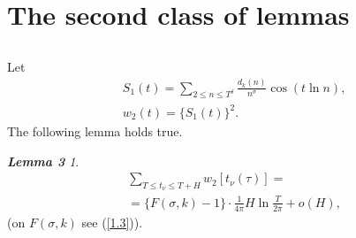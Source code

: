 \documentclass{amsart}
\theoremstyle{definition}
\theoremstyle{remark}
\newtheorem*{mydef53}{{\bf Lemma 3}}
\numberwithin{equation}{section}
\begin{document}
\section{The second class of lemmas}

\subsection{}

Let
\begin{equation} \label{5.1}
\begin{split}
 & S_1(t)=\sum_{2\leq n\leq T^\delta}\frac{d_k(n)}{n^\sigma}\cos(t\ln n), \\
 & w_2(t)=\{ S_1(t)\}^2.
\end{split}
\end{equation}
The following lemma holds true.

\begin{mydef53}
\begin{equation} \label{5.2}
\begin{split}
 & \sum_{T\leq t_\nu\leq T+H} w_2[t_\nu(\tau)]= \\
 & = \{ F(\sigma,k)-1\}\cdot \frac{1}{4\pi} H\ln\frac{T}{2\pi}+o(H),
\end{split}
\end{equation}
(on $F(\sigma,k)$ see (\ref{1.3})).
\end{mydef53}
\end{document}
